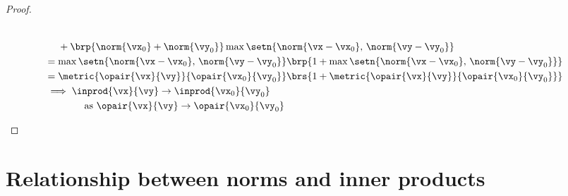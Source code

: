 \begin{proof}
\begin{enumerate}
\begin{align*}
          \\&\phantom{{}\le{}}
             + \brp{\norm{\vx_0}+\norm{\vy_0}}\max\setn{\norm{\vx-\vx_0},\,\norm{\vy-\vy_0}}
        \\&=   \max\setn{\norm{\vx-\vx_0},\, \norm{\vy-\vy_0}}
               \brp{1 + \max\setn{\norm{\vx-\vx_0},\,\norm{\vy-\vy_0}} }
        \\&=   \metric{\opair{\vx}{\vy}}{\opair{\vx_0}{\vy_0}}
               \brs{1 + \metric{\opair{\vx}{\vy}}{\opair{\vx_0}{\vy_0}} }
        \\&\implies \inprod{\vx}{\vy}\to\inprod{\vx_0}{\vy_0}
          \\&\hspace{4em}\text{as } \opair{\vx}{\vy}\to\opair{\vx_0}{\vy_0}
      \end{align*}
  \end{enumerate}
\end{proof}

\section{Relationship between norms and inner products}
